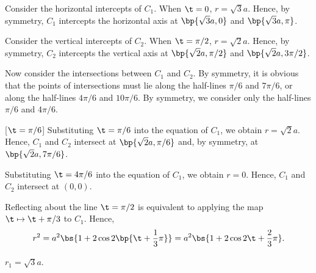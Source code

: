 \begin{solution}
\begin{ppart}
\begin{center}
        \end{center}

        Consider the horizontal intercepts of $C_1$. When $\t = 0$, $r = \sqrt3 a$. Hence, by symmetry, $C_1$ intercepts the horizontal axis at $\bp{\sqrt3a, 0}$ and $\bp{\sqrt3a, \pi}$.

        Consider the vertical intercepts of $C_2$. When $\t = \pi/2$, $r = \sqrt2a$. Hence, by symmetry, $C_2$ intercepts the vertical axis at $\bp{\sqrt2a, \pi/2}$ and $\bp{\sqrt2a, 3\pi/2}$.

        Now consider the intersections between $C_1$ and $C_2$. By symmetry, it is obvious that the points of intersections must lie along the half-lines $\pi/6$ and $7\pi/6$, or along the half-lines $4\pi/6$ and $10\pi/6$. By symmetry, we consider only the half-lines $\pi/6$ and $4\pi/6$.

        [$\t = \pi/6$] Substituting $\t = \pi/6$ into the equation of $C_1$, we obtain $r = \sqrt2 a$. Hence, $C_1$ and $C_2$ intersect at $\bp{\sqrt2a, \pi/6}$ and, by symmetry, at $\bp{\sqrt2a, 7\pi/6}$.

         Substituting $\t = 4\pi/6$ into the equation of $C_1$, we obtain $r = 0$. Hence, $C_1$ and $C_2$ intersect at $(0, 0)$.
    \end{ppart}
    \begin{ppart}
        Reflecting about the line $\t = \pi/2$ is equivalent to applying the map $\t \mapsto \t + \pi/3$ to $C_1$. Hence, \[r^2 = a^2 \bs{1 + 2\cos{2\bp{\t + \frac13\pi}}} = a^2 \bs{1 + 2\cos{2\t + \frac23 \pi }}.\]
    \end{ppart}
    \begin{ppart}
        $r_1 = \sqrt3 a$.
    \end{ppart}
\end{solution}